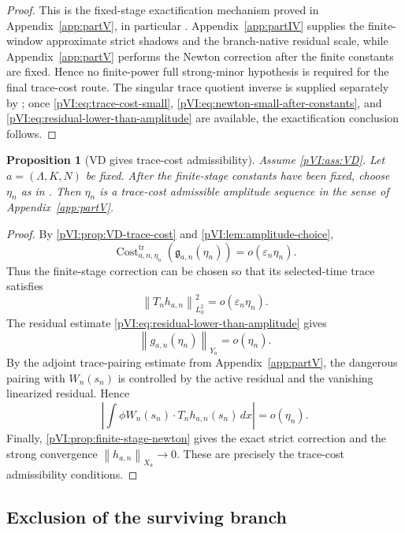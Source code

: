 \documentclass[11pt]{article}
\numberwithin{equation}{section}
\theoremstyle{plain}
\newtheorem{proposition}{Proposition}[section]
\theoremstyle{definition}
\theoremstyle{remark}
\DeclareMathOperator{\Cost}{Cost}
\newcommand{\eps}{\varepsilon}
\newcommand{\tr}{\operatorname{tr}}
\newcommand{\norm}[2]{\left\|#1\right\|_{#2}}
\begin{document}
\begin{proof}
This is the fixed-stage exactification mechanism proved in Appendix~\ref{app:partV}, in particular .  Appendix~\ref{app:partIV} supplies the finite-window approximate strict shadows and the branch-native residual scale, while Appendix~\ref{app:partV} performs the Newton correction after the finite constants are fixed.  Hence no finite-power full strong-minor hypothesis is required for the final trace-cost route.  The singular trace quotient inverse is supplied separately by ; once \eqref{pVI:eq:trace-cost-small}, \eqref{pVI:eq:newton-small-after-constants}, and \eqref{pVI:eq:residual-lower-than-amplitude} are available, the exactification conclusion follows.
\end{proof}

\begin{proposition}[VD gives trace-cost admissibility]\label{pVI:prop:VD-admissible}
Assume \cref{pVI:ass:VD}.  Let \(a=(\Lambda,K,N)\) be fixed.  After the finite-stage constants have been fixed, choose \(\eta_n\) as in .  Then \(\eta_n\) is a trace-cost admissible amplitude sequence in the sense of Appendix~\ref{app:partV}.
\end{proposition}

\begin{proof}
By \cref{pVI:prop:VD-trace-cost} and \cref{pVI:lem:amplitude-choice},
\[
        \Cost_{a,n,\eta_n}^{\tr}(\mathfrak g_{a,n}(\eta_n))
        =
        o(\eps_n\eta_n).
\]
Thus the finite-stage correction can be chosen so that its selected-time trace satisfies
\[
        \norm{T_nh_{a,n}}{L^2_\phi}^2=o(\eps_n\eta_n).
\]
The residual estimate \eqref{pVI:eq:residual-lower-than-amplitude} gives
\[
        \norm{g_{a,n}(\eta_n)}{Y_a}=o(\eta_n).
\]
By the adjoint trace-pairing estimate from Appendix~\ref{app:partV}, the dangerous pairing with \(W_n(s_n)\) is controlled by the active residual and the vanishing linearized residual.  Hence
\[
        \left|
        \int\phi W_n(s_n)\cdot T_nh_{a,n}(s_n)\,dx
        \right|
        =
        o(\eta_n).
\]
Finally, \cref{pVI:prop:finite-stage-newton} gives the exact strict correction and the strong convergence
\(\norm{h_{a,n}}{X_a}\to0\).  These are precisely the trace-cost admissibility conditions.
\end{proof}

\subsection{Exclusion of the surviving branch}
\end{document}
